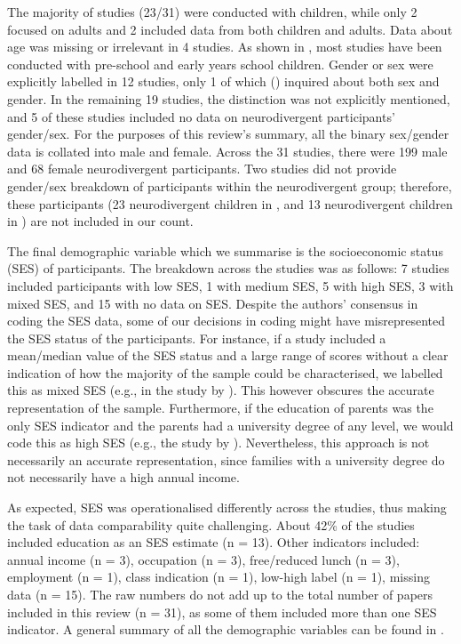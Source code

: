 \documentclass[output=paper]{langscibook}
\begin{document}
The majority of studies (23/31) were conducted with children, while only 2 focused on adults and 2 included data from both children and adults. Data about age was missing or irrelevant in 4 studies. As shown in , most studies have been conducted with pre-school and early years school children. Gender or sex were explicitly labelled in 12 studies, only 1 of which (\citealt{AnguloJimenez2020}) inquired about both sex and gender. In the remaining 19 studies, the distinction was not explicitly mentioned, and 5 of these studies included no data on neurodivergent participants’ gender/sex. For the purposes of this review’s summary, all the binary sex/gender data is collated into male and female. Across the 31 studies, there were 199 male and 68 female neurodivergent participants. Two studies did not provide gender/sex breakdown of participants within the neurodivergent group; therefore, these participants (23 neurodivergent children in \citealt{KingEtAl2021}, and 13 neurodivergent children in \citealt{SoesmanEtAl2022}) are not included in our count.

The final demographic variable which we summarise is the socioeconomic status (SES) of participants. The breakdown across the studies was as follows: 7 studies included participants with low SES, 1 with medium SES, 5 with high SES, 3 with mixed SES, and 15 with no data on SES. Despite the authors’ consensus in coding the SES data, some of our decisions in coding might have misrepresented the SES status of the participants. For instance, if a study included a mean/median value of the SES status and a large range of scores without a clear indication of how the majority of the sample could be characterised, we labelled this as mixed SES (e.g., in the study by \citealt{SnijdersEtAl2025}). This however obscures the accurate representation of the sample. Furthermore, if the education of parents was the only SES indicator and the parents had a university degree of any level, we would code this as high SES (e.g., the study by \citealt{Yu2016}). Nevertheless, this approach is not necessarily an accurate representation, since families with a university degree do not necessarily have a high annual income.

As expected, SES was operationalised differently across the studies, thus making the task of data comparability quite challenging. About 42\% of the studies included education as an SES estimate (n = 13). Other indicators included: annual income (n = 3), occupation (n = 3), free/reduced lunch (n = 3), employment (n = 1), class indication (n = 1), low-high label (n = 1), missing data (n = 15). The raw numbers do not add up to the total number of papers included in this review (n = 31), as some of them included more than one SES indicator. A general summary of all the demographic variables can be found in .
\end{document}
